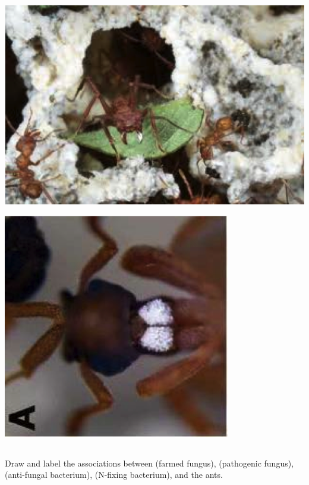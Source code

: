 \begin{frame}[t]
\begin{adjustwidth}{-2em}{-1.5em}
\begin{columns}
\begin{center}
            \includegraphics[height=0.31\textheight]{ants-2.png}

            \includegraphics[height=0.30\textheight]{ants-3.png}
            \end{center}

        \end{columns}

    \end{adjustwidth}
\end{frame}

\begin{frame}[t]
    \begin{adjustwidth}{-2em}{-1.5em}
        Draw and label the associations between  (farmed
        fungus),  (pathogenic fungus), 
        (anti-fungal bacterium),  (N-fixing bacterium), and the
        ants.

    \end{adjustwidth}
\end{frame}


